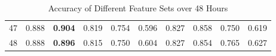 \begin{table}[]
\begin{tabular}{|c|ccccccccc|}
47   & 0.888                            & \textbf{0.904}               & 0.819                              & 0.754                             & 0.596                    & 0.827                             & 0.858                             & 0.750                            & 0.619                       \\ \cline{1-1}
48   & 0.888                            & \textbf{0.896}               & 0.815                              & 0.750                             & 0.604                    & 0.827                             & 0.854                             & 0.765                            & 0.627                       \\ \hline
\end{tabular}
\caption{Accuracy of Different Feature Sets over 48 Hours}
\label{my-label}
\end{table}
 \restoregeometry

